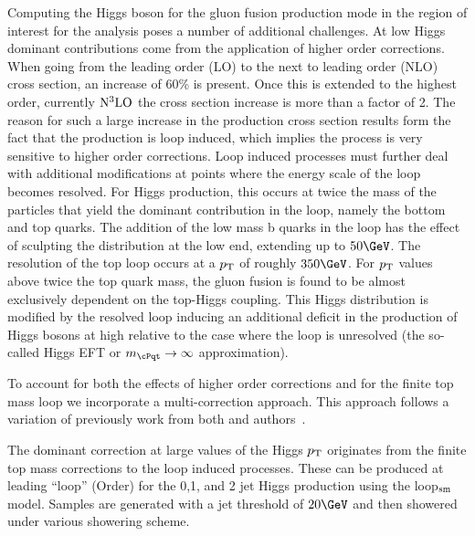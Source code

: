 Computing the Higgs boson \pt for the gluon fusion production mode in the region of interest for the analysis poses a number of additional challenges. At low Higgs \pt dominant contributions come from the application of higher order corrections. When going from the leading order (LO) to the next to leading order (NLO) cross section, an increase of 60\% is present. Once this is extended to the highest order, currently ${\rm N^{3}LO}$ the cross section increase is more than a factor of 2. The reason for such a large increase in the production cross section results form the fact that the production is loop induced, which implies the process is very sensitive to higher order corrections. Loop induced processes must further deal with additional modifications at points where the energy scale of the loop becomes resolved. For Higgs production, this occurs at twice the mass of the particles that yield the dominant contribution in the loop, namely the bottom and top quarks. The addition of the low mass b quarks in the loop has the effect of sculpting the \pt distribution at the low end, extending up to $50\GeV$. The resolution of the top loop occurs at a $p_{\mathrm{T}}$ of roughly $350\GeV$. For $p_{\mathrm{T}}$ values above twice the top quark mass, the gluon fusion is found to be almost exclusively dependent on the top-Higgs coupling.  This Higgs \pt distribution is modified by the resolved loop inducing an additional deficit in the production of Higgs bosons at high \pt relative to the case where the loop is unresolved (the so-called Higgs EFT or $m_{\cPqt}\rightarrow\infty$ approximation). 

To account for both the effects of higher order corrections and for the finite top mass loop we incorporate a multi-correction approach. This approach follows a variation of previously work from both \SHERPA and \MCATNLO authors~\cite{Buschmann:2014sia,Frederix:2016cnl}.  

The dominant correction at large values of the Higgs $p_{\mathrm{T}}$ originates from the finite top mass corrections to the loop induced processes. These can be produced at leading ``loop'' (Order) for the 0,1, and 2 jet Higgs production using the loop$_{\rm sm}$ model. Samples are generated with a jet threshold of $20\GeV$ and then showered under various showering scheme. 

